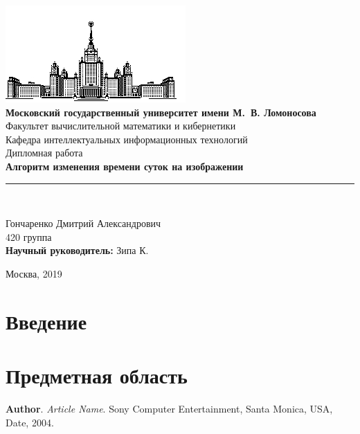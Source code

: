 \documentclass[11pt,a4paper]{extarticle}
\begin{document}
	\begin{titlepage}
		\begin{centering}
			\includegraphics{img/msu}\\
				\large{
					\textbf{Московский государственный университет имени М.\ В. Ломоносова}\\
					Факультет вычислительной математики и кибернетики\\
					Кафедра интеллектуальных информационных технологий\\[4cm]
				}
				\Large{
					Дипломная работа\\[0.5cm]
				}
				\Large{
					\textbf{Алгоритм изменения времени суток на изображении
					}\\					
				}
				\rule[0.3cm]{14cm}{0.02cm}\\[3cm]
		\end{centering}
		\begin{flushright}
			\large{
			Гончаренко Дмитрий Александрович\\
			420 группа \\

			\textbf{Научный руководитель:} Зипа К.\\
			}
		\end{flushright}
		\begin{center}
			\vfill 
			\large{
				Москва, 2019
			}
		\end{center}
	\end{titlepage}

	\begin{abstract}
	\end{abstract}
	
	\newpage
	\tableofcontents
	\newpage

	\section{Введение}
	
	\section{Предметная область}

\begin{thebibliography}{00}

	\textbf{Author}.
	\emph{Article Name}.
	Sony Computer Entertainment, Santa Monica, USA,
	Date, 2004.


\end{thebibliography}
	
\end{document}
